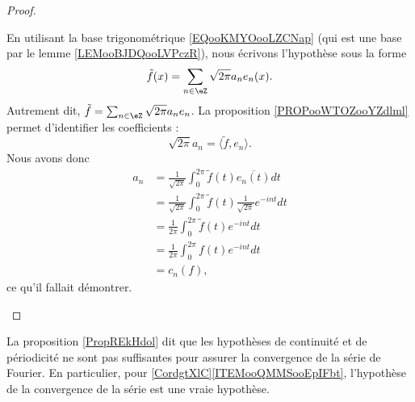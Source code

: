 \begin{proof}
\begin{subproof}
		En utilisant la base trigonométrique \eqref{EQooKMYOooLZCNap} (qui est une base par le lemme \ref{LEMooBJDQooLVPczR}), nous écrivons l'hypothèse sous la forme
		\begin{equation}
			\tilde f(x)=\sum_{n\in \eZ}\sqrt{ 2\pi }a_ne_n(x).
		\end{equation}
		Autrement dit, \( \tilde f=\sum_{n\in \eZ}\sqrt{ 2\pi }a_ne_n\). La proposition \ref{PROPooWTOZooYZdlml} permet d'identifier les coefficients :
		\begin{equation}
			\sqrt{ 2\pi }a_n=\langle \tilde f, e_n\rangle .
		\end{equation}
		Nous avons donc
		\begin{subequations}
			\begin{align}
				a_n & =\frac{1}{ \sqrt{ 2\pi } }\int_0^{2\pi}\tilde f(t)\overline{ e_n(t) }dt                \\
				    & =\frac{1}{ \sqrt{ 2\pi } }\int_0^{2\pi}\tilde f(t)\frac{1}{ \sqrt{ 2\pi } } e^{-int}dt \\
				    & =\frac{1}{ 2\pi }\int_0^{2\pi}\tilde f(t) e^{-int}dt                                   \\
				    & =\frac{1}{ 2\pi }\int_0^{2\pi}f(t) e^{-int}dt                                          \\
				    & =c_n(f),
			\end{align}
		\end{subequations}
		ce qu'il fallait démontrer.
	\end{subproof}
\end{proof}

\begin{normaltext}
	La proposition \ref{PropREkHdol} dit que les hypothèses de continuité et de périodicité ne sont pas suffisantes pour assurer la convergence de la série de Fourier. En particulier, pour \ref{CordgtXlC}\ref{ITEMooQMMSooEpIFbt}, l'hypothèse de la convergence de la série est une vraie hypothèse.
\end{normaltext}


